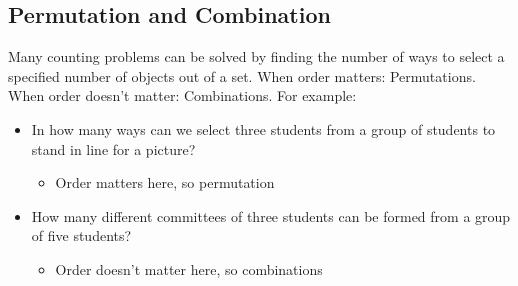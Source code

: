 \documentclass[12pt, letterpaper]{article}
\begin{document}
\subsection{Permutation and Combination}
\begin{minipage}[t]{0.9\linewidth}
	Many counting problems can be solved by finding the number of ways to select a specified number of objects out of a set. \smallbreak
	When order matters: Permutations. \\
	When order doesn't matter: Combinations. \smallbreak
	For example: 
	\begin{itemize}[leftmargin=*, label={}]
		\item In how many ways  can we select three students from a group of students to stand in line for a picture?
		\begin{itemize}
			\item Order matters here, so permutation
		\end{itemize}
		\item How many different committees of three students can be formed from a group of five students?
		\begin{itemize}
			\item Order doesn't matter here, so combinations
		\end{itemize}
	\end{itemize}
\end{minipage}
\end{document}
